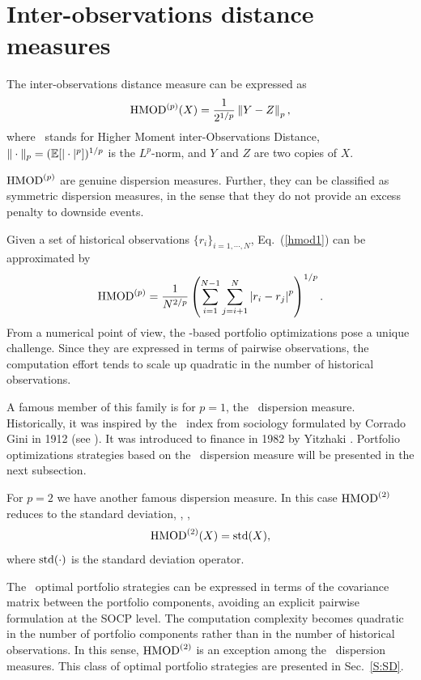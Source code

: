 
\section{Inter-observations distance measures}
The inter-observations distance measure can be expressed  as
\begin{equation}
    \HMOD^{(p)}(X) = \frac{1}{2^{1/p}}\left\| Y - Z \right\|_p,
    \label{hmod1}
\end{equation}
where \HMOD\ stands for Higher Moment inter-Observations Distance,
$\|\cdot\|_p = ({\mathbb E}[|\cdot|^p])^{1/p}$ is the $L^p$-norm, and
$Y$ and $Z$ are two \iid copies of $X$.

${\rm HMOD}^{(p)}$ are genuine dispersion measures. Further, they can
be classified as symmetric dispersion measures, in the sense that they do not provide an excess penalty to downside events.

Given a set of  historical observations $\{r_i\}_{i=1,\cdots,N}$, Eq.~(\ref{hmod1}) can be approximated by
\begin{equation}
    \HMOD^{(p)} = \frac{1}{N^{2/p}}\left( \sum_{i=1}^{N-1} \sum_{j=i+1}^N \left|r_i - r_j \right|^p \right)^{1/p}.
    \label{hmod2}
\end{equation}
From a numerical point of view, the \HMOD-based portfolio optimizations pose a unique challenge. Since they are expressed in terms of pairwise
observations, the computation effort tends to scale up quadratic in the number of historical observations.

A famous member of this family is for $p=1$, the \GINI\
dispersion measure. Historically, it was inspired by the \GINI\ index from
sociology formulated by Corrado Gini in 1912 (see \cite{Giorgi}). It was introduced to finance in 1982 by Yitzhaki \cite{Yitzhaki}.
Portfolio optimizations strategies based on the \GINI\ dispersion measure will be presented in the next subsection.

For $p=2$ we have another famous dispersion measure. In this case ${\rm HMOD}^{(2)}$ reduces to the standard deviation, \SD, \ie,
\begin{equation}
    \HMOD^{(2)}(X) = \std(X),
    \label{hmod3}
\end{equation}
where ${\rm std}(\cdot)$ is the standard deviation operator.

The \SD\ optimal portfolio strategies can be expressed in terms of the covariance matrix between the portfolio components,
avoiding an explicit pairwise formulation at the SOCP level.
The computation complexity becomes quadratic in the number of portfolio components rather than in the number of historical observations.
In this sense, ${\rm HMOD}^{(2)}$ is an exception among the \HMOD\ dispersion measures. This class of optimal portfolio
strategies are presented in Sec.~\ref{S:SD}.

\BackToContents


